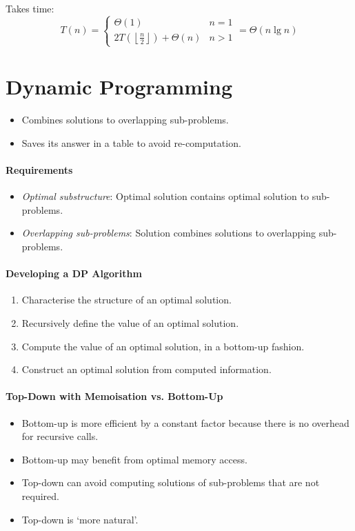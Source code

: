 \documentclass[twocolumn,english]{article}
\numberwithin{equation}{section}
\numberwithin{figure}{section}
\numberwithin{table}{section}
\begin{document}
Takes time:
\[
T\left(n\right)=\begin{cases}
\Theta\left(1\right) & n=1\\
2T\left(\left\lfloor \frac{n}{2}\right\rfloor \right)+\Theta\left(n\right) & n>1
\end{cases}=\Theta\left(n\lg n\right)
\]

\section{Dynamic Programming}
\begin{itemize}
\item Combines solutions to overlapping sub-problems.
\item Saves its answer in a table to avoid re-computation.
\end{itemize}

\paragraph{Requirements}
\begin{itemize}
\item \emph{Optimal substructure}: Optimal solution contains optimal solution
to sub-problems.
\item \emph{Overlapping sub-problems}: Solution combines solutions to overlapping
sub-problems.
\end{itemize}

\paragraph{Developing a DP Algorithm}
\begin{enumerate}
\item Characterise the structure of an optimal solution.
\item Recursively define the value of an optimal solution.
\item Compute the value of an optimal solution, in a bottom-up fashion.
\item Construct an optimal solution from computed information.
\end{enumerate}

\paragraph{Top-Down with Memoisation vs. Bottom-Up}
\begin{itemize}
\item Bottom-up is more efficient by a constant factor because there is
no overhead for recursive calls.
\item Bottom-up may benefit from optimal memory access.
\item Top-down can avoid computing solutions of sub-problems that are not
required.
\item Top-down is `more natural'.
\end{itemize}
\end{document}
